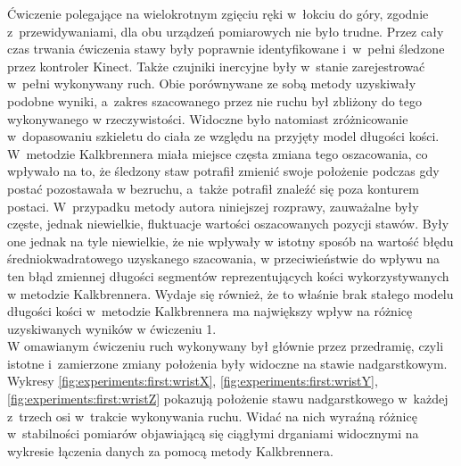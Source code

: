 Ćwiczenie polegające na wielokrotnym zgięciu ręki w~łokciu do góry, zgodnie z~przewidywaniami, dla obu urządzeń pomiarowych nie było trudne. Przez cały czas trwania ćwiczenia stawy były poprawnie identyfikowane i~w~pełni śledzone przez kontroler Kinect. Także czujniki inercyjne były w~stanie zarejestrować w~pełni  wykonywany ruch. Obie porównywane ze sobą metody uzyskiwały podobne wyniki, a~zakres szacowanego przez nie ruchu był zbliżony do tego wykonywanego w rzeczywistości. Widoczne było natomiast zróżnicowanie w~dopasowaniu szkieletu do ciała ze względu na przyjęty model długości kości. W~metodzie Kalkbrennera miała miejsce częsta zmiana tego oszacowania, co wpływało na to, że śledzony staw potrafił zmienić swoje położenie podczas gdy postać pozostawała w bezruchu, a~także potrafił znaleźć się poza konturem postaci. W~przypadku metody autora niniejszej rozprawy, zauważalne były częste, jednak niewielkie, fluktuacje wartości oszacowanych pozycji stawów. Były one jednak na tyle niewielkie, że nie wpływały w istotny sposób na wartość błędu średniokwadratowego uzyskanego szacowania, w przeciwieństwie do wpływu na ten błąd zmiennej długości segmentów reprezentujących kości wykorzystywanych w metodzie Kalkbrennera. Wydaje się również, że to właśnie brak stałego modelu długości kości w~metodzie Kalkbrennera ma największy wpływ na różnicę uzyskiwanych wyników w ćwiczeniu 1. \\
						
W omawianym ćwiczeniu ruch wykonywany był głównie przez przedramię, czyli istotne i~zamierzone zmiany położenia były widoczne na stawie nadgarstkowym. Wykresy \ref{fig:experiments:first:wristX}, \ref{fig:experiments:first:wristY}, \ref{fig:experiments:first:wristZ} pokazują położenie stawu nadgarstkowego w~każdej z~trzech osi w~trakcie wykonywania ruchu. Widać na nich wyraźną różnicę w~stabilności pomiarów objawiającą się ciągłymi drganiami widocznymi na wykresie łączenia danych za pomocą metody Kalkbrennera.
					
